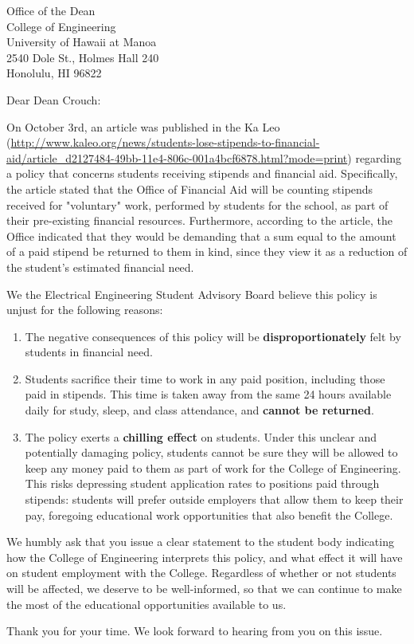 \documentclass[10pt,stdletternofrom,letterpaper,dateno,sigleft]{letter}
\begin{document}
\begin{letter}{Office of the Dean \\ College of Engineering \\ University of Hawaii at Manoa \\ 2540 Dole St., Holmes Hall 240 \\ Honolulu, HI 96822}
\opening{Dear Dean Crouch:}

On October 3rd, an article was published in the Ka Leo (\url{http://www.kaleo.org/news/students-lose-stipends-to-financial-aid/article_d2127484-49bb-11e4-806c-001a4bcf6878.html?mode=print}) regarding a policy that concerns students receiving stipends and financial aid.
Specifically, the article stated that the Office of Financial Aid will be counting stipends received for "voluntary" work, performed by students for the school, as part of their pre-existing financial resources. Furthermore, according to the article, the Office indicated that they would be demanding that a sum equal to the amount of a paid stipend be returned to them in kind, since they view it as a reduction of the student's estimated financial need.

We the Electrical Engineering Student Advisory Board believe this policy is unjust for the following reasons:

\begin{enumerate}
\item The negative consequences of this policy will be \textbf{disproportionately} felt by students in financial need.
\item Students sacrifice their time to work in any paid position, including those paid in stipends. This time is taken away from the same 24 hours available daily for study, sleep, and class attendance, and \textbf{cannot be returned}.
\item The policy exerts a \textbf{chilling effect} on students. Under this unclear and potentially damaging policy, students cannot be sure they will be allowed to keep any money paid to them as part of work for the College of Engineering. This risks depressing student application rates to positions paid through stipends: students will prefer outside employers that allow them to keep their pay, foregoing educational work opportunities that also benefit the College. 
\end{enumerate}

We humbly ask that you issue a clear statement to the student body indicating how the College of Engineering interprets this policy, and what effect it will have on student employment with the College. Regardless of whether or not students will be affected, we deserve to be well-informed, so that we can continue to make the most of the educational opportunities available to us.

Thank you for your time. We look forward to hearing from you on this issue.

\closing{ }


\end{letter}
\end{document}
